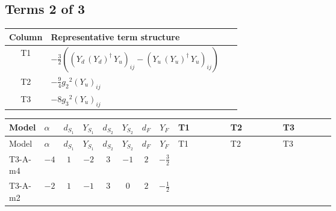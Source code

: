 \documentclass[8pt]{article}
\begin{document}
\begin{landscape}
\subsection*{Terms 2 of 3}
\begin{center}
\begin{tabular}{@{}c >{\raggedright\arraybackslash}p{0.82\linewidth}@{}}
\toprule
Column & Representative term structure \\
\midrule
T1 & \(\displaystyle -\frac{3}{2} (\left({Y_d}\,\left({Y_d}\right)^{\dagger}\,{Y_u}\right)_{ij}-\left({Y_u}\,\left({Y_u}\right)^{\dagger}\,{Y_u}\right)_{ij})\) \\
\midrule
T2 & \(\displaystyle -\frac{9}{4} {g_2}^2 \left({Y_u}\right)_{ij}\) \\
\midrule
T3 & \(\displaystyle -8 {g_3}^2 \left({Y_u}\right)_{ij}\) \\
\midrule
\bottomrule
\end{tabular}
\end{center}
\smallskip
\tiny
\begin{longtable}{@{}llcccccc >{\raggedright\arraybackslash}p{0.21\linewidth} >{\raggedright\arraybackslash}p{0.21\linewidth} >{\raggedright\arraybackslash}p{0.21\linewidth}@{}}
\toprule
Model & $\alpha$ & $d_{S_1}$ & $Y_{S_1}$ & $d_{S_2}$ & $Y_{S_2}$ & $d_F$ & $Y_F$ & T1 & T2 & T3 \\
\midrule
\endfirsthead
\toprule
Model & $\alpha$ & $d_{S_1}$ & $Y_{S_1}$ & $d_{S_2}$ & $Y_{S_2}$ & $d_F$ & $Y_F$ & T1 & T2 & T3 \\
\midrule
\endhead
T3-A-m4 & $-4$ & $1$ & $-2$ & $3$ & $-1$ & $2$ & $-\frac{3}{2}$ & \scriptsize\adjustbox{max width=\linewidth}{$\begin{gathered} -\frac{3}{2} (\left({Y_d}\,\left({Y_d}\right)^{\dagger}\,{Y_u}\right)_{ij}-\left({Y_u}\,\left({Y_u}\right)^{\dagger}\,{Y_u}\right)_{ij})\end{gathered}$} & \scriptsize\adjustbox{max width=\linewidth}{$\begin{gathered} -\frac{9}{4} {g_2}^2 \left({Y_u}\right)_{ij}\end{gathered}$} & \scriptsize\adjustbox{max width=\linewidth}{$\begin{gathered} -8 {g_3}^2 \left({Y_u}\right)_{ij}\end{gathered}$} \\
\midrule
T3-A-m2 & $-2$ & $1$ & $-1$ & $3$ & $0$ & $2$ & $-\frac{1}{2}$ & \scriptsize\adjustbox{max width=\linewidth}{$\begin{gathered} -\frac{3}{2} (\left({Y_d}\,\left({Y_d}\right)^{\dagger}\,{Y_u}\right)_{ij}-\left({Y_u}\,\left({Y_u}\right)^{\dagger}\,{Y_u}\right)_{ij})\end{gathered}$} & \scriptsize\adjustbox{max width=\linewidth}{$\begin{gathered} -\frac{9}{4} {g_2}^2 \left({Y_u}\right)_{ij}\end{gathered}$} & \scriptsize\adjustbox{max width=\linewidth}{$\begin{gathered} -8 {g_3}^2 \left({Y_u}\right)_{ij}\end{gathered}$} \\

\end{longtable}
\end{landscape}
\end{document}
